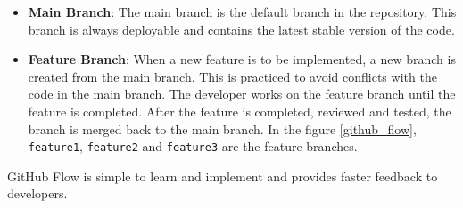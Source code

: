 \begin{itemize}
    \item \textbf{Main Branch}:\newline
    The main branch is the default branch in the repository. This branch is always deployable and contains the latest stable version of the code.

    \item \textbf{Feature Branch}:\newline
    When a new feature is to be implemented, a new branch is created from the main branch. This is practiced to avoid conflicts with the code in the main branch. 
    The developer works on the feature branch until the feature is completed. After the feature is completed, reviewed and tested, the branch is merged back to 
    the main branch. In the figure \ref{github_flow}, \texttt{feature1}, \texttt{feature2} and \texttt{feature3} are the feature branches.
\end{itemize}

GitHub Flow is simple to learn and implement and provides faster feedback to developers. 

